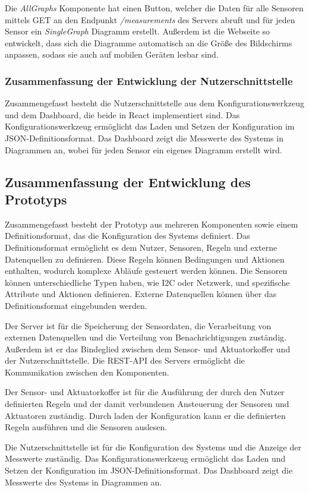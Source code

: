 Die \emph{AllGraphs} Komponente hat einen Button, welcher die Daten für alle Sensoren mittels GET an den Endpunkt \emph{/measurements} des Servers abruft und für jeden Sensor ein \emph{SingleGraph} Diagramm erstellt.
Außerdem ist die Webseite so entwickelt, dass sich die Diagramme automatisch an die Größe des Bildschirms anpassen, sodass sie auch auf mobilen Geräten lesbar sind.

\subsubsection{Zusammenfassung der Entwicklung der Nutzerschnittstelle}
Zusammengefasst besteht die Nutzerschnittstelle aus dem Konfigurationswerkzeug und dem Dashboard, die beide in React implementiert sind.
Das Konfigurationswerkzeug ermöglicht das Laden und Setzen der Konfiguration im JSON-Definitionsformat.
Das Dashboard zeigt die Messwerte des Systems in Diagrammen an, wobei für jeden Sensor ein eigenes Diagramm erstellt wird.


\subsection{Zusammenfassung der Entwicklung des Prototyps}
Zusammengefasst besteht der Prototyp aus mehreren Komponenten sowie einem Definitionsformat, das die Konfiguration des Systems definiert.
Das Definitionsformat ermöglicht es dem Nutzer, Sensoren, Regeln und externe Datenquellen zu definieren.
Diese Regeln können Bedingungen und Aktionen enthalten, wodurch komplexe Abläufe gesteuert werden können.
Die Sensoren können unterschiedliche Typen haben, wie I2C oder Netzwerk, und spezifische Attribute und Aktionen definieren.
Externe Datenquellen können über das Definitionsformat eingebunden werden.

Der Server ist für die Speicherung der Sensordaten, die Verarbeitung von externen Datenquellen und die Verteilung von Benachrichtigungen zuständig.
Außerdem ist er das Bindeglied zwischen dem Sensor- und Aktuatorkoffer und der Nutzerschnittstelle.
Die REST-API des Servers ermöglicht die Kommunikation zwischen den Komponenten.

Der Sensor- und Aktuatorkoffer ist für die Ausführung der durch den Nutzer definierten Regeln und der damit verbundenen Ansteuerung der Sensoren und Aktuatoren zuständig.
Durch laden der Konfiguration kann er die definierten Regeln ausführen und die Sensoren auslesen.

Die Nutzerschnittstelle ist für die Konfiguration des Systems und die Anzeige der Messwerte zuständig.
Das Konfigurationswerkzeug ermöglicht das Laden und Setzen der Konfiguration im JSON-Definitionsformat.
Das Dashboard zeigt die Messwerte des Systems in Diagrammen an.




